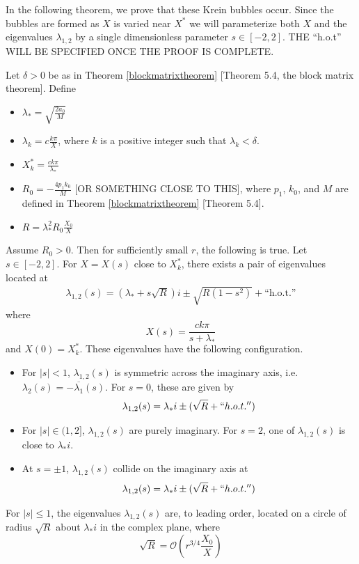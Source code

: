 \documentclass[thesis.tex]{subfiles}
\begin{document}
In the following theorem, we prove that these Krein bubbles occur. Since the bubbles are formed as $X$ is varied near $X^*$ we will parameterize both $X$ and the eigenvalues $\lambda_{1,2}$ by a single dimensionless parameter $s \in [-2, 2]$. THE ``h.o.t'' WILL BE SPECIFIED ONCE THE PROOF IS COMPLETE.

\begin{theorem}\label{theorem:kreinbubbles}
Let $\delta > 0$ be as in Theorem \ref{blockmatrixtheorem} [Theorem 5.4, the block matrix theorem]. Define
\begin{itemize}
\item $\lambda_* = \sqrt{\frac{2 a_0}{M}}$
\item $\lambda_k = c \frac{k \pi}{X}$, where $k$ is a positive integer such that $\lambda_k < \delta$.
\item $X_k^* = \frac{c k \pi}{\lambda_*}$
\item $R_0 = -\frac{4 p_1 k_0}{M}$ [OR SOMETHING CLOSE TO THIS], where $p_1$, $k_0$, and $M$ are defined in Theorem \ref{blockmatrixtheorem} [Theorem 5.4].
\item $R = \lambda_*^2 R_0 \frac{X_0}{X}$ 
\end{itemize}
Assume $R_0 > 0$. Then for sufficiently small $r$, the following is true. Let $s \in [-2, 2]$. For $X = X(s)$ close to $X_k^*$, there exists a pair of eigenvalues located at
\begin{align*}
\lambda_{1,2}(s) = \left( \lambda_* + s \sqrt{R} \right) i \pm \sqrt{R(1 - s^2)} + \text{``h.o.t.''}
\end{align*}
where
\[
X(s) = \frac{c k \pi}{s + \lambda_*}
\]
and $X(0) = X_k^*$. These eigenvalues have the following configuration.
\begin{itemize}
\item For $|s| < 1$, $\lambda_{1,2}(s)$ is symmetric across the imaginary axis, i.e. $\lambda_2(s) = -\overline{\lambda_1}(s)$. For $s = 0$, these are given by
\[
\lambda_{1,2}(s) = \lambda_* i \pm (\sqrt{R} + ``h.o.t.'')
\]
\item For $|s| \in (1, 2]$, $\lambda_{1,2}(s)$
are purely imaginary. For $s = 2$, one of $\lambda_{1,2}(s)$ is close to $\lambda_* i$.
\item At $s = \pm 1$, $\lambda_{1,2}(s)$ collide on the imaginary axis at 
\[
\lambda_{1,2}(s) = \lambda_* i \pm (\sqrt{R} + ``h.o.t.'')
\]
\end{itemize}
For $|s| \leq 1$, the eigenvalues $\lambda_{1,2}(s)$ are, to leading order, located on a circle of radius $\sqrt{R}$ about $\lambda_* i$ in the complex plane, where
\[
\sqrt{R} = \mathcal{O}\left( r^{3/4}\frac{X_0}{X} \right)
\]
\end{theorem}
\end{document}
